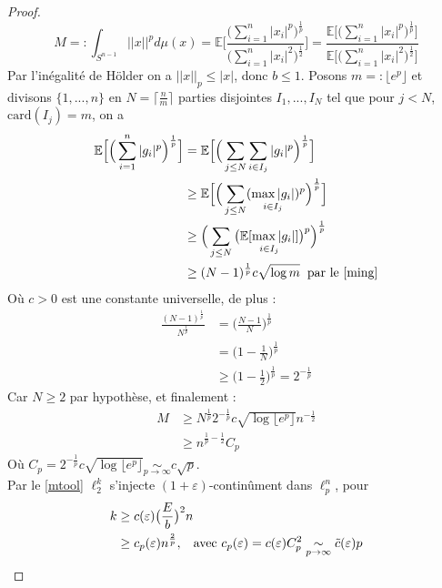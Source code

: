 \documentclass[12pt]{article}
\theoremstyle{definition}
\begin{document}
\begin{proof}
\begin{equation*}
	M =: \int_{S^{n-1}}||x||^p d\mu(x) = \mathbb{E}\Bigg[\frac{\big(\sum_{i=1}^{n}|x_i|^p\big)^{\frac{1}{p}}}{\big(\sum_{i=1}^{n}|x_i|^2\big)^{\frac{1}{2}}}\Bigg]= \frac{\mathbb{E}\Bigg[\big(\sum_{i=1}^{n}|x_i|^p\big)^{\frac{1}{p}}\Bigg]}{\mathbb{E}\Bigg[\big(\sum_{i=1}^{n}|x_i|^2\big)^{\frac{1}{2}}\Bigg]}
\end{equation*}
Par l'inégalité de Hölder on a $||x||_p\leq |x|$, donc $b\leq1$. Posons $m=:\lfloor e^p\rfloor$ et divisons $\{1,...,n\}$ en $N=\lceil\frac{n}{m}\rceil$ parties disjointes $I_1,...,I_N$ tel que pour $j<N$, $\text{card}(I_j)=m$, on a 
	\begin{align*}
		\mathbb{E}\Big[\Big(\sum_{i=1}^{n}|g_i|^p\Big)^{\frac{1}{p}}\Big]&= \mathbb{E}\Big[\Big(\sum_{j\leq N}\sum_{i\in I_j}|g_i|^p\Big)^{\frac{1}{p}}\Big]\\
		&\geq\mathbb{E}\Big[\Big(\sum_{j\leq N}(\underset{i\in I_j}{\max|g_i|})^p\Big)^{\frac{1}{p}}\Big]\\
		&\geq \Big(\sum_{j\leq N}\big(\underset{i\in I_j}{\mathbb{E}[\max|g_i|]}\big)^p\Big)^{\frac{1}{p}}\\
		&\geq(N-1)^{\frac{1}{p}}c\sqrt{\log m} \hspace{2mm} \text{par le \cref{ming}}
	\end{align*}
	Où $c>0$ est une constante universelle, de plus :
	\begin{align*}
	\frac{(N-1)^{\frac{1}{p}}}{N^{\frac{1}{p}}}&=\big(\frac{N-1}{N}\big)^{\frac{1}{p}}\\
	&= \big(1-\frac{1}{N}\big)^{\frac{1}{p}}\\
	&\geq \big(1-\frac{1}{2}\big)^{\frac{1}{p}}=2^{-\frac{1}{p}}
	\end{align*}
	\noindent Car $N\geq 2$ par hypothèse, et finalement :
	\begin{align*}
		M &\geq N^{\frac{1}{p}}2^{-\frac{1}{p}} c\sqrt{\log \lfloor e^p\rfloor} n^{-\frac{1}{2}}\\
		& \geq n^{\frac{1}{p}-\frac{1}{2}}C_p
	\end{align*}
	Où $C_p =2^{-\frac{1}{p}} c\sqrt{\log \lfloor e^p\rfloor}\underset{p\to\infty}{\sim} c\sqrt{p}$.\\
	Par le \cref{mtool} $\ell_2^k$ s'injecte $(1+\varepsilon)$-continûment dans $\ell_p^n$, pour
	\begin{align*}
		k &\geq c(\varepsilon)\big(\frac{E}{b}\big)^2n\\
		&\geq c_p(\varepsilon)n^{\frac{2}{p}}, \hspace{3mm} \text{avec $c_p(\varepsilon) = c(\varepsilon)C_p^2\underset{p\to\infty}{\sim} \tilde{c}(\varepsilon)p$}
	\end{align*}
\end{proof}
\end{document}
